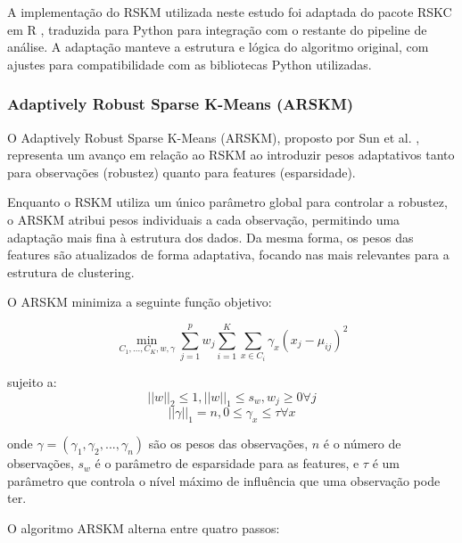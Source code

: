 \documentclass[conference]{IEEEtran}
\begin{document}
A implementação do RSKM utilizada neste estudo foi adaptada do pacote RSKC em R \cite{kondo2016rskc}, traduzida para Python para integração com o restante do pipeline de análise. A adaptação manteve a estrutura e lógica do algoritmo original, com ajustes para compatibilidade com as bibliotecas Python utilizadas.

\subsubsection{Adaptively Robust Sparse K-Means (ARSKM)}
O Adaptively Robust Sparse K-Means (ARSKM), proposto por Sun et al. \cite{sun2018adaptive}, representa um avanço em relação ao RSKM ao introduzir pesos adaptativos tanto para observações (robustez) quanto para features (esparsidade).

Enquanto o RSKM utiliza um único parâmetro global para controlar a robustez, o ARSKM atribui pesos individuais a cada observação, permitindo uma adaptação mais fina à estrutura dos dados. Da mesma forma, os pesos das features são atualizados de forma adaptativa, focando nas mais relevantes para a estrutura de clustering.

O ARSKM minimiza a seguinte função objetivo:

\begin{equation}
\min_{C_1,...,C_K, w, \gamma} \sum_{j=1}^{p} w_j \sum_{i=1}^{K} \sum_{x \in C_i} \gamma_x (x_j - \mu_{ij})^2
\end{equation}

sujeito a:
\begin{equation}
||w||_2 \leq 1, ||w||_1 \leq s_w, w_j \geq 0 \forall j
\end{equation}
\begin{equation}
||\gamma||_1 = n, 0 \leq \gamma_x \leq \tau \forall x
\end{equation}

onde $\gamma = (\gamma_1, \gamma_2, ..., \gamma_n)$ são os pesos das observações, $n$ é o número de observações, $s_w$ é o parâmetro de esparsidade para as features, e $\tau$ é um parâmetro que controla o nível máximo de influência que uma observação pode ter.

O algoritmo ARSKM alterna entre quatro passos:
\end{document}

